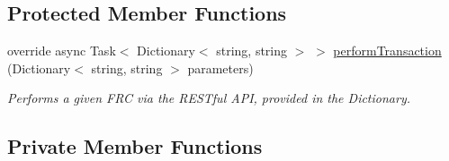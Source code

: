 \subsection*{Protected Member Functions}
\begin{DoxyCompactItemize}
\item 
override async Task$<$ Dictionary$<$ string, string $>$ $>$ \mbox{\hyperlink{class_form_sim_1_1_rest_handler_aaba7a1239d5e4e2eb63e0f24f76341d1}{perform\+Transaction}} (Dictionary$<$ string, string $>$ parameters)
\begin{DoxyCompactList}\small\item\em Performs a given F\+RC via the R\+E\+S\+Tful A\+PI, provided in the Dictionary. \end{DoxyCompactList}\end{DoxyCompactItemize}
\subsection*{Private Member Functions}
